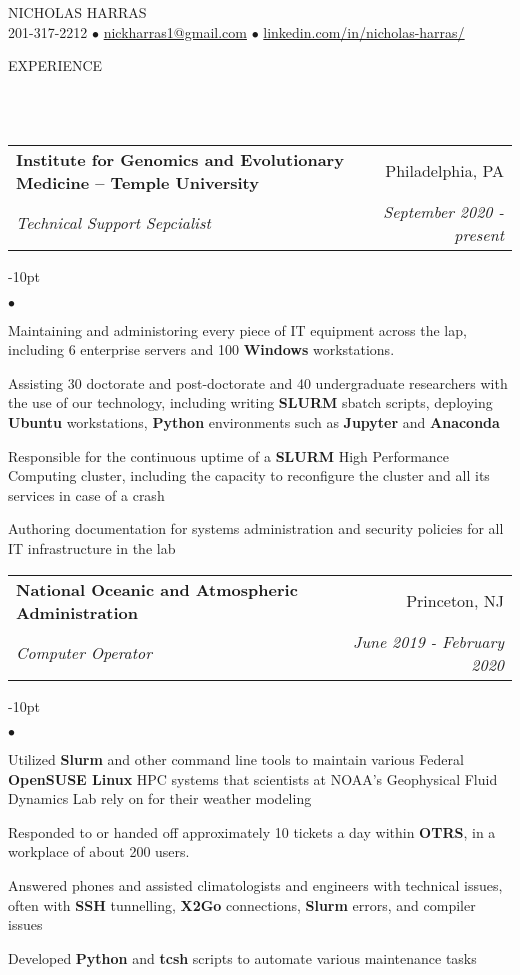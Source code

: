 \documentclass[12pt]{article}
\makeatletter
\newcommand{\mailto}[1]{
	\href{mailto:#1}{#1}
}
\newcommand{\contact}[2]{
	\vspace*{-8pt}
	\begin{center}
		{#1}\\ %
		#2
	\end{center}
	\vspace*{-12pt}
}
\newcommand{\header}[1]{
	\vspace*{12pt} %
	{\hspace*{-14pt}\vspace*{6pt} #1}
	\vspace*{-6pt} 
	\lineunder
}
\newcommand{\lineunder}{
	\vspace*{-8pt} \\ 
	\hspace*{-18pt} 
	\hrulefill \\
}
\newcommand{\subheading}[4]{
 	\vspace{5pt}
    	\begin{tabular*}{1.01\textwidth}
    		{l@{\extracolsep{\fill}}r}
      		\hspace{-16pt}\textbf{#1} & #2 \\
      		\hspace{-16pt}\textit{\small#3} & \textit{\small #4} \\
    	\end{tabular*}
    \vspace{-4pt}
}
\newenvironment{achievements}{
\begin{adjustwidth}{-10pt}{}
  \begin{list}{$\bullet$}{
  	\topsep 0pt \itemsep -4pt}}
  	{\vspace*{2pt}\end{list}
\end{adjustwidth}
}
\makeatother
\begin{document}
\small
\smallskip
\vspace*{-40pt}

\contact{\huge{N}\LARGE{ICHOLAS} \huge{H}\LARGE{ARRAS}}{201-317-2212 $\bullet$ \mailto{nickharras1@gmail.com} $\bullet$ \href{https://www.github.com/harras}{linkedin.com/in/nicholas-harras/}}


\vspace{-8pt}
\header{EXPERIENCE}

\subheading
	{Institute for Genomics and Evolutionary Medicine -- Temple University}{Philadelphia, PA}
	{Technical Support Sepcialist}{September 2020 - present}
	\begin{achievements}
		\item Maintaining and administoring every piece of IT equipment across the lap, including 6 enterprise servers and 100 \textbf{Windows} workstations. 
		\item Assisting 30 doctorate and post-doctorate and 40 undergraduate researchers with the use of our technology, including writing \textbf{SLURM} sbatch scripts, deploying \textbf{Ubuntu} workstations, \textbf{Python} environments such as \textbf{Jupyter} and \textbf{Anaconda}
		\item Responsible for the continuous uptime of a \textbf{SLURM} High Performance Computing cluster, including the capacity to reconfigure the cluster and all its services in case of a crash
		\item Authoring documentation for systems administration and security policies for all IT infrastructure in the lab
	\end{achievements}

\subheading
	{National Oceanic and Atmospheric Administration}{Princeton, NJ}
	{Computer Operator}{June 2019 - February 2020}
	\begin{achievements}
		\item Utilized \textbf{Slurm} and other command line tools to maintain various Federal \textbf{OpenSUSE Linux} HPC systems that scientists at NOAA's Geophysical Fluid Dynamics Lab rely on for their weather modeling
		\item Responded to or handed off approximately 10 tickets a day within \textbf{OTRS}, in a workplace of about 200 users.	
		\item Answered phones and assisted climatologists and engineers with technical issues, often with \textbf{SSH} tunnelling, \textbf{X2Go} connections, \textbf{Slurm} errors, and compiler issues
		\item Developed \textbf{Python} and \textbf{tcsh} scripts to automate various maintenance tasks
		
		
	\end{achievements}
\end{document}
